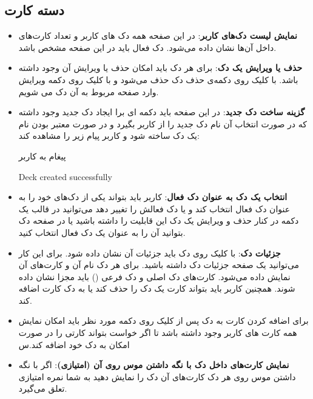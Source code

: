 \documentclass[]{article}
\begin{document}
\subsection*{{\titr دسته کارت}}
\begin{itemize}
    \item \textbf{نمایش لیست دک‌های کاربر}: در این صفحه همه دک های کاربر و تعداد کارت‌های داخل آن‌ها نشان داده می‌شود. دک فعال باید در این صفحه مشخص باشد.
    \item \textbf{حذف یا ویرایش یک دک}:
     برای هر دک باید امکان حذف یا ویرایش آن وجود داشته باشد. با کلیک روی دکمه‌ی حذف دک حذف می‌شود و با کلیک روی دکمه ویرایش وارد صفحه مربوط به آن دک می شویم.
     
    \item \textbf{گزینه ساخت دک جدید}:
     در این صفحه باید دکمه ای برا ایجاد دک جدید وجود داشته که در صورت انتخاب آن نام دک جدید را از کاربر بگیرد و در صورت معتبر بودن نام  یک دک ساخته شود و کاربر پیام زیر را مشاهده کند:
     
     \begin{mybox}[colback=yellow]{پیغام به کاربر}
     	\begin{latin}	
     		Deck created successfully
     	\end{latin}
     \end{mybox}
 
    \item \textbf{انتخاب یک دک به عنوان دک فعال}:
     کاربر باید بتواند یکی از دک‌های خود را به عنوان دک فعال انتخاب کند و یا دک فعالش را تغییر دهد می‌توانید در قالب یک دکمه در کنار حذف و ویرایش یک دک این قابلیت را داشته باشید یا در صفحه دک بتوانید آن را به عنوان یک دک فعال انتخاب کنید.
     
    \item \textbf{جزئیات دک}:
     با کلیک روی دک باید جزئیات آن نشان داده شود. برای این کار می‌توانید یک صفحه جزئیات دک داشته باشید. برای هر دک نام آن و کارت‌های آن نمایش داده می‌شود. کارت‌های دک اصلی و دک فرعی () باید مجزا نشان داده شوند. همچنین کاربر باید بتواند کارت یک دک را حذف کند یا به دک کارت اضافه کند.
    \item 
    برای اضافه کردن کارت به دک پس از کلیک روی دکمه مورد نظر باید امکان نمایش همه کارت های کاربر وجود داشته باشد تا اگر خواست بتواند کارتی را در صورت امکان به دک خود اضافه کند.س

     
    \item \textbf{نمایش کارت‌های داخل دک با نگه داشتن موس روی آن (امتیازی)}:
    اگر با نگه داشتن موس روی هر دک کارت‌های آن دک را نمایش دهید به شما نمره امتیازی تعلق می‌گیرد.    
\end{itemize}
\end{document}
